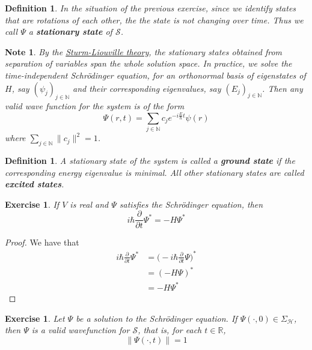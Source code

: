 \documentclass[12pt]{amsart}
\newtheorem{defn}[thm]{Definition}
\newtheorem{note}[thm]{Note}
\newtheorem{ex}[thm]{Exercise}
\newcommand{\sch}{Schr\"{o}dinger }
\newcommand{\Sig}{\Sigma}
\newcommand{\N}{\mathbb{N}}
\newcommand{\R}{\mathbb{R}}
\newcommand{\MS}{\mathcal{S}}
\newcommand{\MH}{\mathcal{H}}
\newcommand{\p}[1]{\frac{\partial}{\partial{#1}}}
\begin{document}
	\begin{defn}
		In the situation of the previous exercise, since we identify states that are rotations of each other, the the state is not changing over time. Thus we call $\Psi$ a \textbf{stationary state} of $\MS$. 
	\end{defn}

	\begin{note}
		By the \href{https://en.wikipedia.org/wiki/Sturm%E2%80%93Liouville_theory}{Sturm-Liouville theory}, the stationary states obtained from separation of variables span the whole solution space. In practice, we solve the time-independent \sch equation, for an orthonormal basis of eigenstates of $H$, say $(\psi_{j})_{j \in \N}$ and their corresponding eigenvalues, say $(E_{j})_{j \in \N}$. Then any valid wave function for the system is of the form $$\Psi(r,t) = \sum_{j \in \N} c_j e^{-i \frac{E}{\hbar}t} \psi(r)$$ where $\sum\limits_{j \in \N} \|c_j\|^2 = 1$.
	\end{note}


	\begin{defn}
		A stationary state of the system is called a \textbf{ground state} if the corresponding energy eigenvalue is minimal. All other stationary states are called \textbf{excited states}.
	\end{defn}

	\begin{ex}
		If $V$ is real and $\Psi$ satisfies the Schr\"{o}dinger equation, then $$i\hbar \p{t} \Psi^* = -H\Psi^* $$
	\end{ex}
	
	\begin{proof}
		We have that 
		\begin{align*}
			i \hbar \p{t} \Psi^{*} 
			&= \bigg(-i \hbar \p{t} \Psi\bigg)^*\\
			&=( - H \Psi )^*\\
			&= -H \Psi^*
		\end{align*}
	\end{proof}

		\begin{ex}
		Let $\Psi$ be a solution to the \sch equation. If $\Psi(\cdot, 0) \in \Sig_{\MH}$, then $\Psi$ is a valid wavefunction for $\MS$, that is, for each $t \in \R$, $$\| \Psi(\cdot, t) \| = 1$$
	\end{ex}
	
\end{document}
